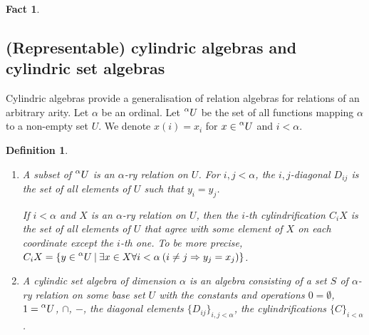 \documentclass[a4paper]{article}
\theoremstyle{defin}
\newtheorem{defin}{Definition}
\theoremstyle{theorem}
\theoremstyle{prop}
\theoremstyle{lemma}
\theoremstyle{fact}
\newtheorem{fact}{Fact}
\theoremstyle{ex}
\theoremstyle{col}
\begin{document}
\begin{fact}
\end{fact}

\subsection{(Representable) cylindric algebras and cylindric set algebras}

Cylindric algebras provide a generalisation of relation algebras for relations of an arbitrary arity. Let $\alpha$ be an ordinal. Let $\prescript{\alpha}{}U$ be the set of all functions mapping $\alpha$ to a non-empty set $U$. We denote $x(i) = x_i$ for
$x \in \prescript{\alpha}{}U$ and $i < \alpha$.

\begin{defin}
$ $

  \begin{enumerate}
    \item A subset of $\prescript{\alpha}{}U$ is an $\alpha$-ry relation on $U$. For $i, j < \alpha$, the $i,j$-diagonal $D_{ij}$ is the set of all
    elements of $U$ such that $y_i = y_j$.

    If $i < \alpha$ and $X$ is an $\alpha$-ry relation on $U$, then
    the $i$-th cylindrification $C_i X$ is the set of all elements of $U$ that agree with some element of $X$ on each coordinate except the
    $i$-th one. To be more precise,
    $C_i X = \{ y \in \prescript{\alpha}{}U \: | \: \exists x \in X \forall i < \alpha \: (i \neq j \Rightarrow y_j = x_j)\}$.
    \item A cylindic set algebra of dimension $\alpha$ is an algebra consisting of a set $S$ of $\alpha$-ry relation on some base set $U$
    with the constants and operations $0 = \emptyset$, $1 = \prescript{\alpha}{}U$, $\cap$, $-$, the diagonal elements $\{ D_{ij} \}_{i, j < \alpha}$,
    the cylindrifications $\{ C \}_{i < \alpha}$.


\end{enumerate}
\end{defin}
\end{document}
